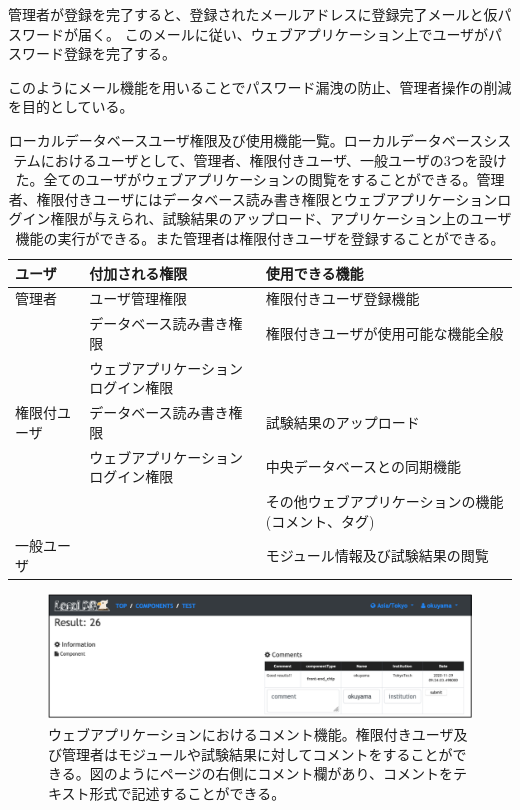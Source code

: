 管理者が登録を完了すると、登録されたメールアドレスに登録完了メールと仮パスワードが届く。
このメールに従い、ウェブアプリケーション上でユーザがパスワード登録を完了する。

このようにメール機能を用いることでパスワード漏洩の防止、管理者操作の削減を目的としている。

\clearpage
\begin{table}[btp]
\begin{center}
\caption[ローカルデータベースユーザ権限及び使用機能一覧]{ローカルデータベースユーザ権限及び使用機能一覧。ローカルデータベースシステムにおけるユーザとして、管理者、権限付きユーザ、一般ユーザの3つを設けた。全てのユーザがウェブアプリケーションの閲覧をすることができる。管理者、権限付きユーザにはデータベース読み書き権限とウェブアプリケーションログイン権限が与えられ、試験結果のアップロード、アプリケーション上のユーザ機能の実行ができる。また管理者は権限付きユーザを登録することができる。}
\label{user_functions_summary}
  \small
  \begin{tabular}{|lll|} \hline
    ユーザ       & 付加される権限                               & 使用できる機能 \\ \hline
    管理者       & ユーザ管理権限                     & 権限付きユーザ登録機能\\ 
                 & データベース読み書き権限           & 権限付きユーザが使用可能な機能全般\\ 
                 & ウェブアプリケーションログイン権限 & \\ \hline
    権限付ユーザ & データベース読み書き権限           & 試験結果のアップロード\\ 
                 & ウェブアプリケーションログイン権限 & 中央データベースとの同期機能\\ 
                 &                                    & その他ウェブアプリケーションの機能(コメント、タグ)\\ \hline
    一般ユーザ   &                                    & モジュール情報及び試験結果の閲覧　\\ \hline
  \end{tabular}
\end{center}
\end{table}

\begin{figure}[btp]\centering
\includegraphics[width=12cm]{./viewer_comment.png}
\caption[ウェブアプリケーションにおけるコメント機能]{ウェブアプリケーションにおけるコメント機能。権限付きユーザ及び管理者はモジュールや試験結果に対してコメントをすることができる。図のようにページの右側にコメント欄があり、コメントをテキスト形式で記述することができる。}
\label{webapp_comment}
\end{figure}

